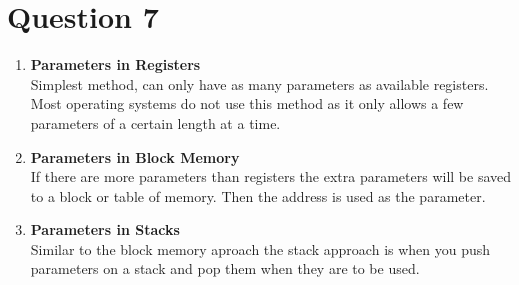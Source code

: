 \documentclass[11pt]{article}
\begin{document}
\section*{Question 7}
\begin{enumerate}
\item \textbf{Parameters in Registers}\\
Simplest method, can only have as many 
parameters as available registers. Most 
operating systems do not use this method as 
it only allows a few parameters of a certain
length at a time.

\item \textbf{Parameters in Block Memory}\\
If there are more parameters than registers
the extra parameters will be saved to a block or 
table of memory. Then the address is used as the 
parameter.

\item \textbf{Parameters in Stacks}\\
Similar to the block memory aproach the
stack approach is when you push parameters on
a stack and pop them when they are to be used.

\end{enumerate}
\end{document}
